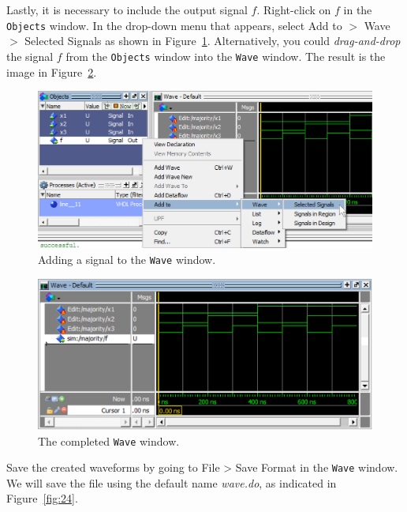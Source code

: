 \documentclass[11pt, twoside, pdftex]{article}
\begin{document}
Lastly, it is necessary to include the output signal $f$. Right-click on $f$ in the
\texttt{Objects} window. In the drop-down menu that appears, select
{\sf Add to $>$ Wave $>$ Selected Signals} as shown in Figure~\ref{fig:22}.
Alternatively, you could {\it drag-and-drop} the signal $f$
from the \texttt{Objects} window into the \texttt{Wave} window.
The result is the image in Figure~\ref{fig:23}. 

\begin{figure}[H]
   \begin{center}
      \includegraphics[scale=0.75]{figures/add_selected.png}
       \caption{Adding a signal to the \texttt{Wave} window.} 
	 \label{fig:22}
	 \end{center}
\end{figure}

\begin{figure}[H]
   \begin{center}
      \includegraphics[scale=0.75]{figures/complete_wave.png}
       \caption{The completed \texttt{Wave} window.} 
	 \label{fig:23}
	 \end{center}
\end{figure}

Save the created waveforms by going to {\sf File > Save Format} in the \texttt{Wave} window. 
We will save the file using the default name {\it wave.do}, as indicated in Figure~\ref{fig:24}.
\end{document}

